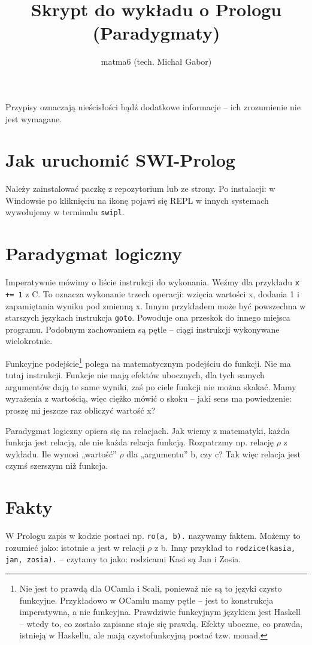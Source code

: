 \documentclass[12pt,a4paper]{article}
\author{matma6 (tech. Michał Gabor)}
\title{Skrypt do wykładu o Prologu (Paradygmaty)}
\begin{document}
\maketitle
Przypisy oznaczają nieścisłości bądź dodatkowe informacje – ich zrozumienie nie jest wymagane.
\section{Jak uruchomić SWI-Prolog}
Należy zainstalować paczkę z repozytorium lub ze strony. Po instalacji:
w Windowsie po kliknięciu na ikonę pojawi się REPL
w innych systemach wywołujemy w terminalu \verb+swipl+.
\section{Paradygmat logiczny}
Imperatywnie mówimy o liście instrukcji do wykonania. Weźmy dla przykładu \verb!x += 1! z C. To oznacza wykonanie trzech operacji: wzięcia wartości x, dodania 1 i zapamiętania wyniku pod zmienną x. Innym przykładem może być powszechna w starszych językach instrukcja \verb!goto!. Powoduje ona przeskok do innego miejsca programu. Podobnym zachowaniem są pętle – ciągi instrukcji wykonywane wielokrotnie.

Funkcyjne podejście\footnote{Nie jest to prawdą dla OCamla i Scali, ponieważ nie są to języki czysto funkcyjne. Przykładowo w OCamlu mamy pętle – jest to konstrukcja imperatywna, a nie funkcyjna. Prawdziwie funkcyjnym językiem jest Haskell – wtedy to, co zostało zapisane staje się prawdą. Efekty uboczne, co prawda, istnieją w Haskellu, ale mają czystofunkcyjną postać tzw. monad.} polega na matematycznym podejściu do funkcji. Nie ma tutaj instrukcji. Funkcje nie mają efektów ubocznych, dla tych samych argumentów dają te same wyniki, zaś po ciele funkcji nie można skakać. Mamy wyrażenia z wartością, więc ciężko mówić o skoku – jaki sens ma powiedzenie: proszę mi jeszcze raz obliczyć wartość x?

Paradygmat logiczny opiera się na relacjach. Jak wiemy z matematyki, każda funkcja jest relacją, ale nie każda relacja funkcją. Rozpatrzmy np. relację $\rho$ z wykładu. Ile wynosi „wartość” $\rho$ dla „argumentu” b, czy c? Tak więc relacja jest czymś szerszym niż funkcja.

\section{Fakty}
W Prologu zapis w kodzie postaci np. \verb+ro(a, b).+ nazywamy faktem. Możemy to rozumieć jako: istotnie a jest w relacji $\rho$ z b. Inny przykład to \verb+rodzice(kasia, jan, zosia).+ – czytamy to jako: rodzicami Kasi są Jan i Zosia.
\end{document}
